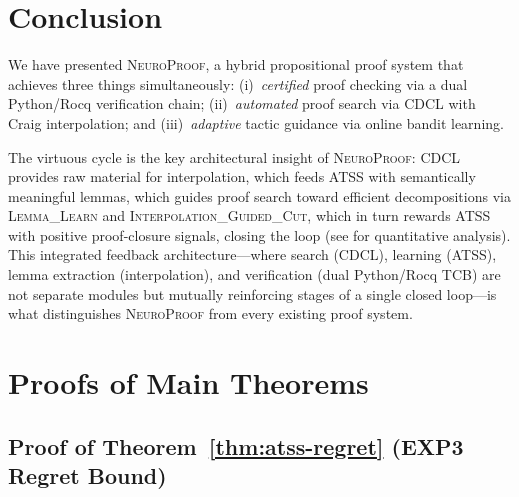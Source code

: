 \documentclass[conference]{IEEEtran}
\newcommand{\NP}{\textsc{NeuroProof}}
\begin{document}
\section{Conclusion}
\label{sec:conclusion}

We have presented \NP{}, a hybrid propositional proof system that
achieves three things simultaneously: (i)~\emph{certified} proof
checking via a dual Python/Rocq verification chain; (ii)~\emph{automated}
proof search via CDCL with Craig interpolation; and
(iii)~\emph{adaptive} tactic guidance via online bandit learning.

The virtuous cycle is the key architectural insight of \NP{}:
CDCL provides raw material for interpolation, which feeds ATSS
with semantically meaningful lemmas, which guides proof search
toward efficient decompositions via
\textsc{Lemma\_Learn} and \textsc{Interpolation\_Guided\_Cut},
which in turn rewards ATSS with positive proof-closure signals,
closing the loop (see  for quantitative
analysis).  This integrated feedback architecture---where search
(CDCL), learning (ATSS), lemma extraction (interpolation), and
verification (dual Python/Rocq TCB) are not separate modules
but mutually reinforcing stages of a single closed loop---is
what distinguishes \NP{} from every existing proof system.





\appendix

\section{Proofs of Main Theorems}
\label{app:proofs}

\subsection{Proof of Theorem~\ref{thm:atss-regret} (EXP3 Regret Bound)}
\end{document}
